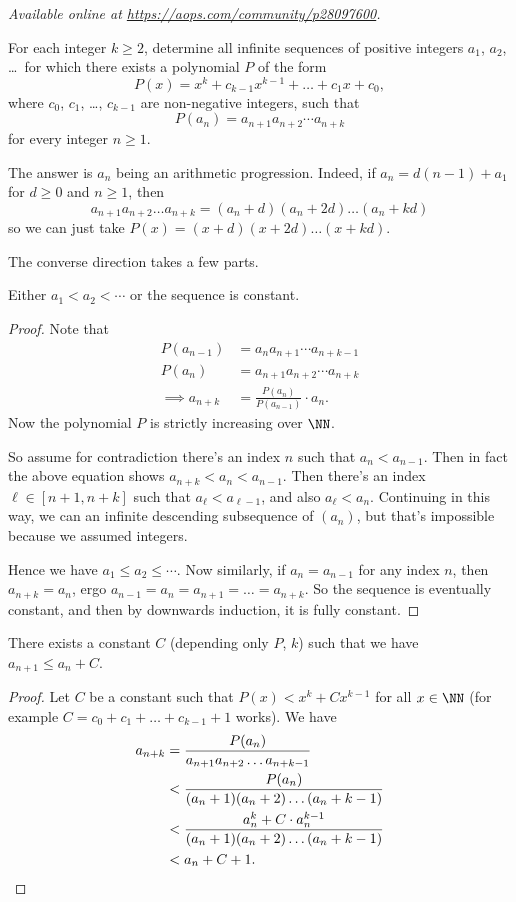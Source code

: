 \textsl{Available online at \url{https://aops.com/community/p28097600}.}
\begin{mdframed}[style=mdpurplebox,frametitle={Problem statement}]
For each integer $k\geq 2$, determine all infinite sequences of positive integers
$a_1$, $a_2$, \dots\ for which there exists a polynomial $P$ of the form
\[ P(x)=x^k+c_{k-1}x^{k-1}+\dots + c_1 x+c_0, \]
where $c_0$, $c_1$, \dots, $c_{k-1}$ are non-negative integers, such that
\[ P(a_n)=a_{n+1}a_{n+2}\dotsm a_{n+k} \]
for every integer $n\geq 1$.
\end{mdframed}
The answer is $a_n$ being an arithmetic progression.
Indeed, if $a_n = d(n-1) + a_1$ for $d \ge 0$ and $n \ge 1$, then
\[ a_{n+1} a_{n+2} \dots a_{n+k} = (a_n+d)(a_n+2d)\dots(a_n+kd) \]
so we can just take $P(x) = (x+d)(x+2d) \dots (x+kd)$.

The converse direction takes a few parts.
\begin{claim*}
  Either $a_1 < a_2 < \dotsb$ or the sequence is constant.
\end{claim*}
\begin{proof}
  Note that
  \begin{align*}
    P(a_{n-1}) &= a_{n}a_{n+1}\dotsm a_{n+k-1} \\
    P(a_n) &= a_{n+1}a_{n+2}\dotsm a_{n+k} \\
    \implies a_{n+k} &= \frac{P(a_n)}{P(a_{n-1})} \cdot a_n.
  \end{align*}
  Now the polynomial $P$ is strictly increasing over $\NN$.

  So assume for contradiction there's an index $n$ such that $a_n < a_{n-1}$.
  Then in fact the above equation shows $a_{n+k} < a_n < a_{n-1}$.
  Then there's an index $\ell \in [n+1,n+k]$ such that
  $a_\ell < a_{\ell-1}$, and also $a_\ell < a_n$.
  Continuing in this way, we can an infinite descending subsequence of $(a_n)$,
  but that's impossible because we assumed integers.

  Hence we have $a_1 \le a_2 \le \dotsb$.
  Now similarly, if $a_n = a_{n-1}$ for any index $n$, then $a_{n+k} = a_n$,
  ergo $a_{n-1} = a_n = a_{n+1} = \dots = a_{n+k}$.
  So the sequence is eventually constant, and then by downwards induction,
  it is fully constant.
\end{proof}

\begin{claim*}
  There exists a constant $C$ (depending only $P$, $k$)
  such that we have $a_{n+1} \leq a_n + C$.
\end{claim*}
\begin{proof}
  Let $C$ be a constant such that $P(x) < x^k + Cx^{k-1}$ for all $x \in \NN$
  (for example $C = c_0 + c_1 + \dots + c_{k-1} + 1$ works).
  We have
  \begin{align*}
    a_{n+k} &= \frac{P(a_n)}{a_{n+1} a_{n+2} \dots a_{n+k-1}} \\
        &< \frac{P(a_n)}{(a_n+1)(a_n+2)\dots(a_n+k-1)} \\
        &< \frac{a_n^k + C \cdot a_n^{k-1}}{(a_n+1)(a_n+2)\dots(a_n+k-1)} \\
        &< a_n + C + 1. \qedhere
  \end{align*}
\end{proof}

